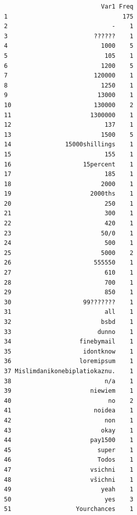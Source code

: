 \documentclass[]{article}
\newenvironment{Shaded}{\begin{snugshade}}{\end{snugshade}}
\newcommand{\KeywordTok}[1]{\textcolor[rgb]{0.94,0.87,0.69}{{#1}}}
\newcommand{\StringTok}[1]{\textcolor[rgb]{0.80,0.58,0.58}{{#1}}}
\newcommand{\NormalTok}[1]{\textcolor[rgb]{0.80,0.80,0.80}{{#1}}}
\begin{document}
\begin{verbatim}
                           Var1 Freq
1                                175
2                             -    1
3                        ??????    1
4                          1000    5
5                           105    1
6                          1200    5
7                        120000    1
8                          1250    1
9                         13000    1
10                       130000    2
11                      1300000    1
12                          137    1
13                         1500    5
14               15000shillings    1
15                          155    1
16                    15percent    1
17                          185    1
18                         2000    1
19                      2000ths    1
20                          250    1
21                          300    1
22                          420    1
23                         50/0    1
24                          500    1
25                         5000    2
26                       555550    1
27                          610    1
28                          700    1
29                          850    1
30                    99???????    1
31                          all    1
32                         bsbd    1
33                        dunno    1
34                   finebymail    1
35                    idontknow    1
36                   loremipsum    1
37 Mislimdanikonebiplatiokaznu.    1
38                          n/a    1
39                      niewiem    1
40                           no    2
41                       noidea    1
42                          non    1
43                         okay    1
44                      pay1500    1
45                        super    1
46                        Todos    1
47                      vsichni    1
48                      všichni    1
49                         yeah    1
50                          yes    3
51                  Yourchances    1
\end{verbatim}

\begin{Shaded}
\end{Shaded}
\end{document}
